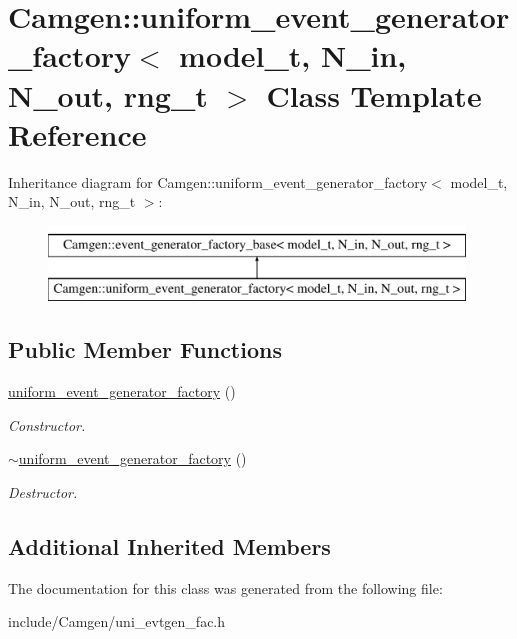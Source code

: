 \hypertarget{a00560}{}\section{Camgen\+:\+:uniform\+\_\+event\+\_\+generator\+\_\+factory$<$ model\+\_\+t, N\+\_\+in, N\+\_\+out, rng\+\_\+t $>$ Class Template Reference}
\label{a00560}
Inheritance diagram for Camgen\+:\+:uniform\+\_\+event\+\_\+generator\+\_\+factory$<$ model\+\_\+t, N\+\_\+in, N\+\_\+out, rng\+\_\+t $>$\+:\begin{figure}[H]
\begin{center}
\leavevmode
\includegraphics[height=2.000000cm]{a00560}
\end{center}
\end{figure}
\subsection*{Public Member Functions}
\begin{DoxyCompactItemize}
\item 
\hypertarget{a00560_a1127b49fdfeb09b115ba959bcc9331da}{}\hyperlink{a00560_a1127b49fdfeb09b115ba959bcc9331da}{uniform\+\_\+event\+\_\+generator\+\_\+factory} ()\label{a00560_a1127b49fdfeb09b115ba959bcc9331da}

\begin{DoxyCompactList}\small\item\em Constructor. \end{DoxyCompactList}\item 
\hypertarget{a00560_a411f7b90b470b00df8fbeacfecb2d3a7}{}\hyperlink{a00560_a411f7b90b470b00df8fbeacfecb2d3a7}{$\sim$uniform\+\_\+event\+\_\+generator\+\_\+factory} ()\label{a00560_a411f7b90b470b00df8fbeacfecb2d3a7}

\begin{DoxyCompactList}\small\item\em Destructor. \end{DoxyCompactList}\end{DoxyCompactItemize}
\subsection*{Additional Inherited Members}


The documentation for this class was generated from the following file\+:\begin{DoxyCompactItemize}
\item 
include/\+Camgen/uni\+\_\+evtgen\+\_\+fac.\+h\end{DoxyCompactItemize}
